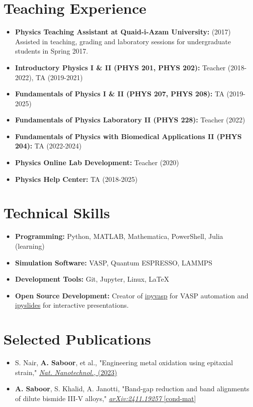 \documentclass[letter,11pt]{article}
\begin{document}
\section{Teaching Experience}
\begin{itemize}
    \item \textbf{Physics Teaching Assistant at Quaid-i-Azam University:} (2017) \\ 
        Assisted in teaching, grading and laboratory sessions for undergraduate students in Spring 2017.
    \item \textbf{Introductory Physics I \& II (PHYS 201, PHYS 202):} Teacher (2018-2022), TA (2019-2021)
    \item \textbf{Fundamentals of Physics I \& II (PHYS 207, PHYS 208):} TA (2019-2025)
    \item \textbf{Fundamentals of Physics Laboratory II (PHYS 228):} Teacher (2022)
    \item \textbf{Fundamentals of Physics with Biomedical Applications II (PHYS 204):} TA (2022-2024)
    \item \textbf{Physics Online Lab Development:} Teacher (2020)
    \item \textbf{Physics Help Center:} TA (2018-2025)
\end{itemize}

\section{Technical Skills}
\begin{itemize}
    \item \textbf{Programming:} Python, MATLAB, Mathematica, PowerShell, Julia (learning)
    \item \textbf{Simulation Software:} VASP, Quantum ESPRESSO, LAMMPS
    \item \textbf{Development Tools:} Git, Jupyter, Linux, \LaTeX
    \item \textbf{Open Source Development:} Creator of \href{https://github.com/asaboor-gh/ipyvasp}{ipyvasp} for VASP automation and \href{https://github.com/asaboor-gh/ipyslides}{ipyslides} for interactive presentations.
\end{itemize}

\section{Selected Publications}
\begin{itemize}
    \item S. Nair, \textbf{A. Saboor}, et al., "Engineering metal oxidation using epitaxial strain," \href{https://www.nature.com/articles/s41565-023-01397-0}{\textit{Nat. Nanotechnol.}, (2023)}
    \item \textbf{A. Saboor}, S. Khalid, A. Janotti, "Band-gap reduction and band alignments of dilute bismide III-V alloys," \href{https://arxiv.org/abs/2411.19257}{\textit{arXiv:2411.19257} [cond-mat]}
\end{itemize}
\end{document}
